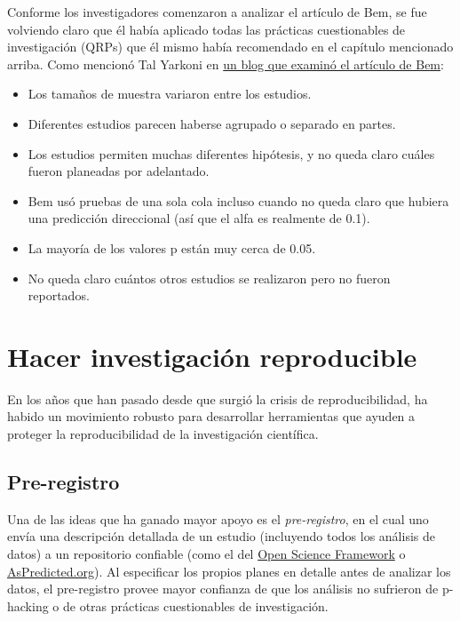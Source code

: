 \documentclass[
  12pt,
]{book}
\providecommand{\tightlist}{%
  \setlength{\itemsep}{0pt}\setlength{\parskip}{0pt}}
\begin{document}
Conforme los investigadores comenzaron a analizar el artículo de Bem, se fue volviendo claro que él había aplicado todas las prácticas cuestionables de investigación (QRPs) que él mismo había recomendado en el capítulo mencionado arriba. Como mencionó Tal Yarkoni en \href{http://www.talyarkoni.org/blog/2011/01/10/the-psychology-of-parapsychology-or-why-good-researchers-publishing-good-articles-in-good-journals-can-still-get-it-totally-wrong/}{un blog que examinó el artículo de Bem}:

\begin{itemize}
\tightlist
\item
  Los tamaños de muestra variaron entre los estudios.
\item
  Diferentes estudios parecen haberse agrupado o separado en partes.
\item
  Los estudios permiten muchas diferentes hipótesis, y no queda claro cuáles fueron planeadas por adelantado.
\item
  Bem usó pruebas de una sola cola incluso cuando no queda claro que hubiera una predicción direccional (así que el alfa es realmente de 0.1).
\item
  La mayoría de los valores p están muy cerca de 0.05.
\item
  No queda claro cuántos otros estudios se realizaron pero no fueron reportados.
\end{itemize}

\hypertarget{hacer-investigaciuxf3n-reproducible}{%
\section{Hacer investigación reproducible}\label{hacer-investigaciuxf3n-reproducible}}

En los años que han pasado desde que surgió la crisis de reproducibilidad, ha habido un movimiento robusto para desarrollar herramientas que ayuden a proteger la reproducibilidad de la investigación científica.

\hypertarget{pre-registro}{%
\subsection{Pre-registro}\label{pre-registro}}

Una de las ideas que ha ganado mayor apoyo es el \emph{pre-registro}, en el cual uno envía una descripción detallada de un estudio (incluyendo todos los análisis de datos) a un repositorio confiable (como el del \href{http://osf.io}{Open Science Framework} o \href{http://aspredicted.org}{AsPredicted.org}). Al especificar los propios planes en detalle antes de analizar los datos, el pre-registro provee mayor confianza de que los análisis no sufrieron de p-hacking o de otras prácticas cuestionables de investigación.
\end{document}
